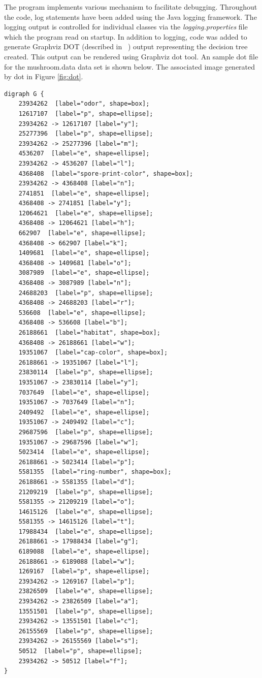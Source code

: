 \documentclass[10pt]{report}
\begin{document}
The program implements various mechanism to facilitate
debugging. Throughout the code, log statements have been added using
the Java logging framework. The logging output is controlled for
individual classes via the \textit{logging.properties} file which the program
read on startup. In addition to logging, code was added to generate
Graphviz DOT (described in ~\cite{Graphviz2001}) output representing
the decision tree created. This output can be rendered using Graphviz
dot tool. An sample dot file for the mushroom.data data set is shown
below. The associated image generated by dot in Figure \ref{fig:dot}.


\begin{verbatim}
digraph G {
	23934262  [label="odor", shape=box];
	12617107  [label="p", shape=ellipse];
	23934262 -> 12617107 [label="y"];
	25277396  [label="p", shape=ellipse];
	23934262 -> 25277396 [label="m"];
	4536207  [label="e", shape=ellipse];
	23934262 -> 4536207 [label="l"];
	4368408  [label="spore-print-color", shape=box];
	23934262 -> 4368408 [label="n"];
	2741851  [label="e", shape=ellipse];
	4368408 -> 2741851 [label="y"];
	12064621  [label="e", shape=ellipse];
	4368408 -> 12064621 [label="h"];
	662907  [label="e", shape=ellipse];
	4368408 -> 662907 [label="k"];
	1409681  [label="e", shape=ellipse];
	4368408 -> 1409681 [label="o"];
	3087989  [label="e", shape=ellipse];
	4368408 -> 3087989 [label="n"];
	24688203  [label="p", shape=ellipse];
	4368408 -> 24688203 [label="r"];
	536608  [label="e", shape=ellipse];
	4368408 -> 536608 [label="b"];
	26188661  [label="habitat", shape=box];
	4368408 -> 26188661 [label="w"];
	19351067  [label="cap-color", shape=box];
	26188661 -> 19351067 [label="l"];
	23830114  [label="p", shape=ellipse];
	19351067 -> 23830114 [label="y"];
	7037649  [label="e", shape=ellipse];
	19351067 -> 7037649 [label="n"];
	2409492  [label="e", shape=ellipse];
	19351067 -> 2409492 [label="c"];
	29687596  [label="p", shape=ellipse];
	19351067 -> 29687596 [label="w"];
	5023414  [label="e", shape=ellipse];
	26188661 -> 5023414 [label="p"];
	5581355  [label="ring-number", shape=box];
	26188661 -> 5581355 [label="d"];
	21209219  [label="p", shape=ellipse];
	5581355 -> 21209219 [label="o"];
	14615126  [label="e", shape=ellipse];
	5581355 -> 14615126 [label="t"];
	17988434  [label="e", shape=ellipse];
	26188661 -> 17988434 [label="g"];
	6189088  [label="e", shape=ellipse];
	26188661 -> 6189088 [label="w"];
	1269167  [label="p", shape=ellipse];
	23934262 -> 1269167 [label="p"];
	23826509  [label="e", shape=ellipse];
	23934262 -> 23826509 [label="a"];
	13551501  [label="p", shape=ellipse];
	23934262 -> 13551501 [label="c"];
	26155569  [label="p", shape=ellipse];
	23934262 -> 26155569 [label="s"];
	50512  [label="p", shape=ellipse];
	23934262 -> 50512 [label="f"];
}
\end{verbatim}
\end{document}
